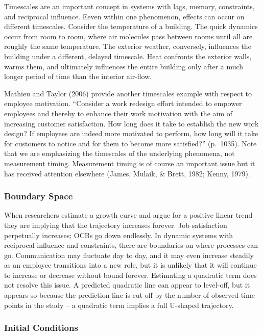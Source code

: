 \documentclass[english,,man]{apa6}
\theoremstyle{definition}
\theoremstyle{definition}
\theoremstyle{definition}
\theoremstyle{remark}
\begin{document}
Timescales are an important concept in systems with lags, memory,
constraints, and reciprocal influence. Eeven within one phenomenon,
effects can occur on different timescales. Consider the temperature of a
building. The quick dynamics occur from room to room, where air
molecules pass between rooms until all are roughly the same temperature.
The exterior weather, conversely, influences the building under a
different, delayed timescale. Heat confronts the exterior walls, warms
them, and ultimately influences the entire building only after a much
longer period of time than the interior air-flow.

Mathieu and Taylor (2006) provide another timescales example with
respect to employee motivation. \enquote{Consider a work redesign effort
intended to empower employees and thereby to enhance their work
motivation with the aim of increasing customer satisfaction. How long
does it take to establish the new work design? If employees are indeed
more motivated to perform, how long will it take for customers to notice
and for them to become more satisfied?} (p.~1035). Note that we are
emphasizing the timescales of the underlying phenomena, not measurement
timing. Measurement timing is of course an important issue but it has
received attention elsewhere (James, Mulaik, \& Brett, 1982; Kenny,
1979).

\hypertarget{boundary-space}{%
\subsubsection{Boundary Space}\label{boundary-space}}

When researchers estimate a growth curve and argue for a positive linear
trend they are implying that the trajectory increases forever. Job
satisfaction perpetually increases; OCBs go down endlessly. In dynamic
systems with reciprocal influence and constraints, there are boundaries
on where processes can go. Communication may fluctuate day to day, and
it may even increase steadily as an employee transitions into a new
role, but it is unlikely that it will continue to increase or decrease
without bound forever. Estimating a quadratic term does not resolve this
issue. A predicted quadratic line can appear to level-off, but it
appears so because the prediction line is cut-off by the number of
observed time points in the study -- a quadratic term implies a full
U-shaped trajectory.

\hypertarget{initial-conditions}{%
\subsubsection{Initial Conditions}\label{initial-conditions}}
\end{document}
